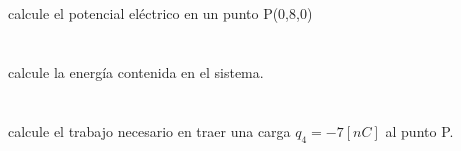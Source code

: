 \documentclass[legalpaper,12pt,addpoints]{exam}
\begin{document}
\begin{questions}
\begin{parts}
        \part {\bf{}} calcule el potencial eléctrico en un punto P(0,8,0)
        \vspace{8cm}
        \part {\bf{}} calcule la energía contenida en el sistema.
        \vspace{8cm}
        \part {\bf{}} calcule el trabajo necesario en traer una carga $q_4=-7[nC]$ al punto P.
        \vspace{4cm}
        \end{parts}
 

\newpage








		
	
	\end{questions}
\end{document}
